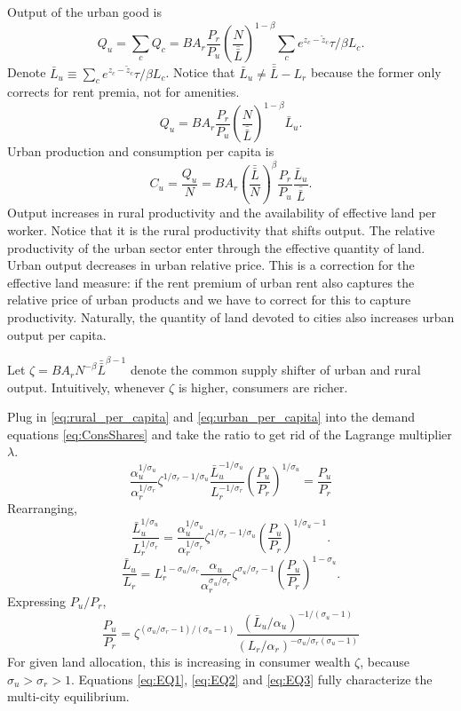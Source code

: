 \documentclass[12pt]{article}
\begin{document}
Output of the urban good is
\[
Q_u = \sum_c Q_c
= B A_r \frac{P_r}{P_u}
\left(\frac {N}
	{\bar{\bar L}}
\right)^{1-\beta}
\sum_c e^{z_c-\tilde z_c}\tau/\beta L_c.
\]
Denote $\bar L_u \equiv \sum_c e^{z_c-\tilde z_c}\tau/\beta L_c$. Notice that $\bar L_u \neq \bar{\bar L}-L_r$ because the former only corrects for rent premia, not for amenities.
\[
Q_u =  B A_r \frac{P_r}{P_u}
\left(\frac {N}
	{\bar{\bar L}}
\right)^{1-\beta}
\bar L_u.
\]
Urban production and consumption per capita is
\begin{equation}\label{eq:urban_per_capita}
C_u=\frac {Q_u}{N} = 
B A_r \left(\frac{\bar{\bar L}}{N}\right)^{\beta}
 \frac{P_r}{P_u}
\frac {\bar L_u}
	{\bar{\bar L}}
.
\end{equation}
Output increases in rural productivity and the availability of effective land per worker. Notice that it is the rural productivity that shifts output. The relative productivity of the urban sector enter through the effective quantity of land. Urban output decreases in urban relative price. This is a correction for the effective land measure: if the rent premium of urban rent also captures the relative price of urban products and we have to correct for this to capture productivity. Naturally, the quantity of land devoted to cities also increases urban output per capita.

Let $\zeta = B A_r N^{-\beta}{\bar{\bar L}}^{\beta-1}$ denote the common supply shifter of urban and rural output. Intuitively, whenever $\zeta$ is higher, consumers are richer.

Plug in \eqref{eq:rural_per_capita} and \eqref{eq:urban_per_capita} into the demand equations \eqref{eq:ConsShares} and take the ratio to get rid of the Lagrange multiplier $\lambda$.
\[
\frac{\alpha_u^{1/\sigma_u}}{\alpha_r^{1/\sigma_r}}
\zeta^{1/\sigma_r-1/\sigma_u}
\frac {\bar L_u^{-1/\sigma_u}}
{L_r^{-1/\sigma_r}}
\left(\frac {P_u}{P_r}\right)^{1/\sigma_u}
= \frac {P_u}{P_r}
\]
Rearranging,
\[
\frac {\bar L_u^{1/\sigma_u}}
{L_r^{1/\sigma_r}}
=
\frac{\alpha_u^{1/\sigma_u}}{\alpha_r^{1/\sigma_r}}
\zeta^{1/\sigma_r-1/\sigma_u}
\left(\frac {P_u}{P_r}\right)^{1/\sigma_u-1}
.\]
\[
\frac {\bar L_u}
{L_r}
=
L_r^{1-\sigma_u/\sigma_r}
\frac{\alpha_u}{\alpha_r^{\sigma_u/\sigma_r}}
\zeta^{\sigma_u/\sigma_r-1}
\left(\frac {P_u}{P_r}\right)^{1-\sigma_u}
.\]
Expressing 
 $P_u/P_r$,
\begin{equation}\label{eq:EQ3}\tag{iii}
\frac {P_u}{P_r}
=
\zeta^{(\sigma_u/\sigma_r-1)/(\sigma_u-1)}
\frac {(\bar L_u/\alpha_u)^{-1/(\sigma_u-1)}}
{(L_r/\alpha_r)^{-\sigma_u/\sigma_r(\sigma_u-1)}}
\end{equation}
For given land allocation, this is increasing in consumer wealth $\zeta$, because $\sigma_u>\sigma_r>1$. Equations \eqref{eq:EQ1}, \eqref{eq:EQ2} and \eqref{eq:EQ3} fully characterize the multi-city equilibrium.
\end{document}
